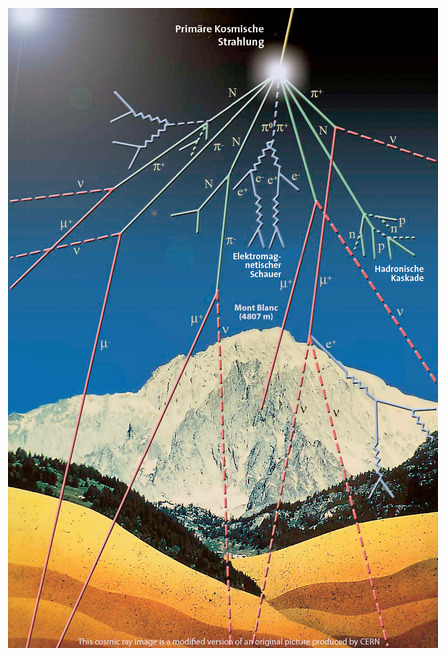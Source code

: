 \documentclass{beamer}
\begin{document}
\begin{frame}
\begin{columns}
\begin{column}{0.4\textwidth}
      \centering
      \includegraphics[width=\textwidth]{sm/KosmischeStrahlung.jpg}
    \end{column}
  \end{columns}
\end{frame}
\end{document}

